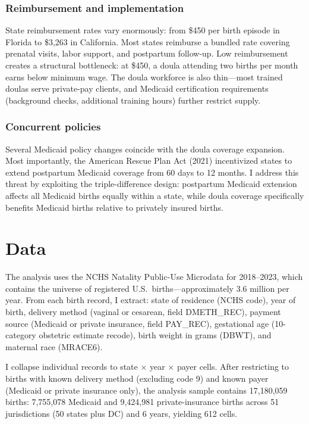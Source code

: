 \documentclass[12pt]{article}
\begin{document}
\subsubsection*{Reimbursement and implementation} State reimbursement rates vary enormously: from \$450 per birth episode in Florida to \$3,263 in California. Most states reimburse a bundled rate covering prenatal visits, labor support, and postpartum follow-up. Low reimbursement creates a structural bottleneck: at \$450, a doula attending two births per month earns below minimum wage. The doula workforce is also thin---most trained doulas serve private-pay clients, and Medicaid certification requirements (background checks, additional training hours) further restrict supply.

\subsubsection*{Concurrent policies} Several Medicaid policy changes coincide with the doula coverage expansion. Most importantly, the American Rescue Plan Act (2021) incentivized states to extend postpartum Medicaid coverage from 60 days to 12 months. I address this threat by exploiting the triple-difference design: postpartum Medicaid extension affects all Medicaid births equally within a state, while doula coverage specifically benefits Medicaid births relative to privately insured births.


\section{Data}

The analysis uses the NCHS Natality Public-Use Microdata for 2018--2023, which contains the universe of registered U.S.\ births---approximately 3.6 million per year. From each birth record, I extract: state of residence (NCHS code), year of birth, delivery method (vaginal or cesarean, field DMETH\_REC), payment source (Medicaid or private insurance, field PAY\_REC), gestational age (10-category obstetric estimate recode), birth weight in grams (DBWT), and maternal race (MRACE6).

I collapse individual records to state $\times$ year $\times$ payer cells. After restricting to births with known delivery method (excluding code 9) and known payer (Medicaid or private insurance only), the analysis sample contains 17,180,059 births: 7,755,078 Medicaid and 9,424,981 private-insurance births across 51 jurisdictions (50 states plus DC) and 6 years, yielding 612 cells.
\end{document}
